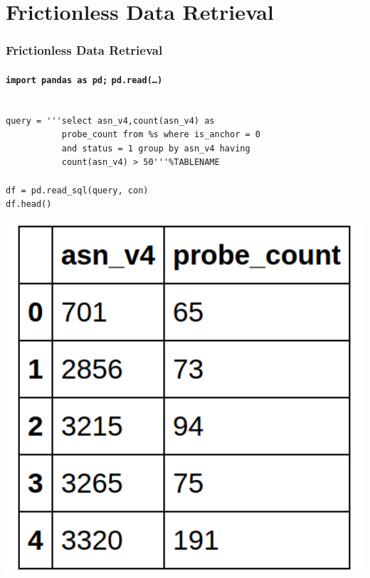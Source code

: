 \section{Frictionless Data Retrieval}
\begin{frame}[fragile]
  \frametitle{Frictionless Data Retrieval}
  \framesubtitle{\texttt{import pandas as pd;} \texttt{pd.read(\dots)}}
    \begin{lstlisting}

query = '''select asn_v4,count(asn_v4) as
           probe_count from %s where is_anchor = 0
           and status = 1 group by asn_v4 having
           count(asn_v4) > 50'''%TABLENAME

df = pd.read_sql(query, con)
df.head()
  \end{lstlisting}
  \centering
  \includegraphics[width=.3\linewidth]{figures/pandas-read-sql}\\
\end{frame}
